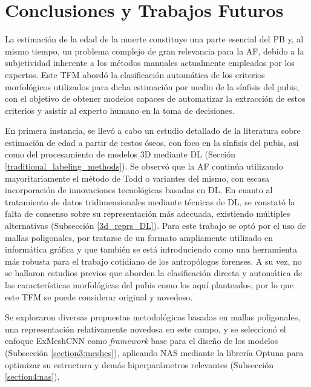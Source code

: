 \chapter{Conclusiones y Trabajos Futuros}

La estimación de la edad de la muerte constituye una parte esencial del PB y, al mismo tiempo, un problema complejo de gran relevancia para la AF, debido a la subjetividad inherente a los métodos manuales actualmente empleados por los expertos. Este TFM abordó la clasificación automática de los criterios morfológicos utilizados para dicha estimación por medio de la sínfisis del pubis, con el objetivo de obtener modelos capaces de automatizar la extracción de estos criterios y asistir al experto humano en la toma de decisiones.

En primera instancia, se llevó a cabo un estudio detallado de la literatura sobre estimación de edad a partir de restos óseos, con foco en la sínfisis del pubis, así como del procesamiento de modelos 3D mediante DL (Sección \ref{traditional_labeling_methods}). Se observó que la AF continúa utilizando mayoritariamente el método de Todd \cite{RefWorks:RefID:19-todd1921age} o variantes del mismo, con escasa incorporación de innovaciones tecnológicas basadas en DL. En cuanto al tratamiento de datos tridimensionales mediante técnicas de DL, se constató la falta de consenso sobre su representación más adecuada, existiendo múltiples alternativas (Subsección \ref{3d_reprs_DL}). Para este trabajo se optó por el uso de mallas poligonales, por tratarse de un formato ampliamente utilizado en informática gráfica y que también se está introduciendo como una herramienta más robusta para el trabajo cotidiano de los antropólogos forenses. A su vez, no se hallaron estudios previos que aborden la clasificación directa y automática de las características morfológicas del pubis como los aquí planteados, por lo que este TFM se puede considerar original y novedoso.

Se exploraron diversas propuestas metodológicas basadas en mallas poligonales, una representación relativamente novedosa en este campo, y se seleccionó el enfoque ExMeshCNN \cite{kim_exmeshcnn_2022} como \textit{framework} base para el diseño de los modelos (Subsección \ref{section3:meshes}), aplicando NAS mediante la librería Optuna para optimizar su estructura y demás hiperparámetros relevantes (Subsección \ref{section4:nas}).

